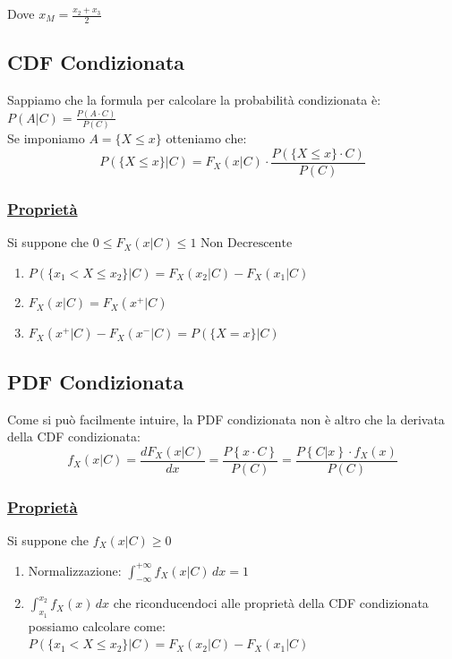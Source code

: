 \documentclass{article}
\begin{document}
Dove $x_M = \frac{x_2 + x_3}{2}$

\subsection{CDF Condizionata}
Sappiamo che la formula per calcolare la probabilità condizionata è: $P(A|C) = \frac{P(A \cdot C)}{P(C)}$ \\
Se imponiamo $A= \big\{ X \leq x\big\}$ otteniamo che: 
\[P\left( \big\{ X \leq x\big\}|C \right) = F_X(x|C) \cdot \frac{P\left( \big\{ X \leq x\big\} \cdot C \right)}{P(C)}\]
\subsubsection{\underline{Proprietà}}
Si suppone che $0 \leq F_X(x|C) \leq 1 \text{ Non Decrescente} $
\begin{enumerate}
    \item $P\left( \big\{x_1 < X \leq x_2\big\} \big| C \right) = F_X(x_2 | C) - F_X(x_1 | C)$
    \item $F_X(x|C) = F_X(x^+ | C)$
    \item $F_X(x^+ | C) - F_X(x^- | C) = P\left( \big\{X = x\big\} \big| C \right)$
\end{enumerate}

\subsection{PDF Condizionata}
Come si può facilmente intuire, la PDF condizionata non è altro che la derivata della CDF condizionata:
\[f_X(x|C) = \frac{dF_X(x|C)}{dx} = \frac{P\left\{x \cdot C\right\}}{P(C)} = \frac{P\left\{C|x\right\} \cdot f_X(x)}{P(C)}\]
\subsubsection{\underline{Proprietà}}
Si suppone che $f_X(x|C) \geq 0 $
\begin{enumerate}
    \item Normalizzazione: $\int_{-\infty}^{+\infty} f_X(x|C) \,dx = 1$
    \item $\int_{x_1}^{x_2} f_X(x) \,dx$ che riconducendoci alle proprietà della CDF condizionata possiamo calcolare come:  \\
    $P\left( \big\{x_1 < X \leq x_2\big\} \big| C \right) = F_X(x_2 | C) - F_X(x_1 | C)$
\end{enumerate}
\end{document}
